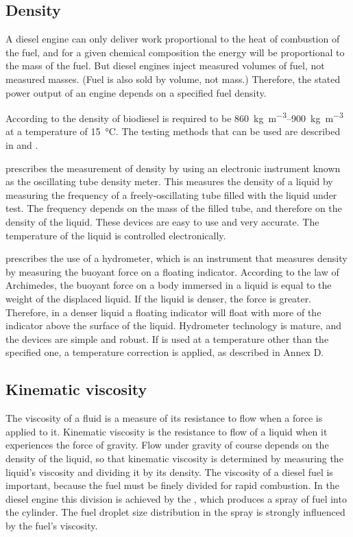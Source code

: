 \subsection{Density}

A diesel engine can only deliver work proportional to the heat of combustion of
the fuel, and for a given chemical composition the energy will be proportional
to the mass of the fuel. But diesel engines inject measured volumes of fuel, not
measured masses. (Fuel is also sold by volume, not mass.) Therefore, the stated
power output of an engine depends on a specified fuel density.

According to  the density of biodiesel is required to be
\SIrange{860}{900}{\kilogram\per\cubic\metre} at a temperature of
\SI{15}{\celsius}. The testing methods that can be used are described in
 and .


 prescribes the measurement of density by using an electronic
instrument known as the oscillating tube density meter. This measures the
density of a liquid by measuring the frequency of a freely-oscillating tube
filled with the liquid under test. The frequency depends on the mass of the
filled tube, and therefore on the density of the liquid.
These devices are easy to use and very accurate. The temperature of the liquid
is controlled electronically.

 prescribes the use of a hydrometer, which is an instrument that
measures density by measuring the buoyant force on a floating indicator.
According to the law of Archimedes, the buoyant force on a body immersed in a
liquid is equal to the weight of the displaced liquid. If the liquid is denser,
the force is greater. Therefore, in a denser liquid a floating indicator will
float with more of the indicator above the surface of the liquid. Hydrometer
technology is mature, and the devices are simple and robust.  If 
is used at a temperature other than the specified one, a temperature correction
is applied, as described in Annex D.

\subsection{Kinematic viscosity}

The viscosity of a fluid is a measure of its resistance to flow when a force is
applied to it. Kinematic viscosity is the resistance to flow of a liquid when it
experiences the force of gravity. Flow under gravity of course depends on the
density of the liquid, so that kinematic viscosity is determined by measuring
the liquid's viscosity and dividing it by its density. The viscosity of a diesel
fuel is important, because the fuel must be finely divided for rapid combustion.
In the diesel engine this division is achieved by the , which
produces a spray of fuel into the cylinder. The fuel droplet size distribution
in the spray is strongly influenced by the fuel's viscosity.


